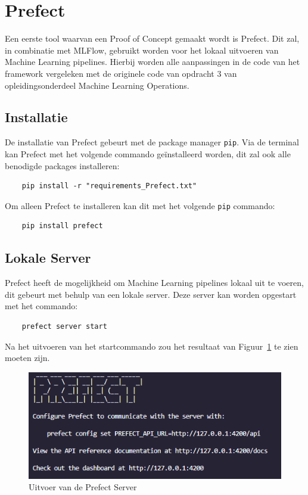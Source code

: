 
\section{Prefect}

Een eerste tool waarvan een Proof of Concept gemaakt wordt is Prefect. Dit zal, in combinatie met MLFlow, gebruikt worden voor het lokaal uitvoeren van Machine Learning pipelines. Hierbij worden alle aanpassingen in de code van het framework vergeleken met de originele code van opdracht 3 van opleidingsonderdeel Machine Learning Operations.

\subsection{Installatie}

De installatie van Prefect gebeurt met de package manager \texttt{pip}. Via de terminal kan Prefect met het volgende commando geïnstalleerd worden, dit zal ook alle benodigde packages installeren:


\begin{verbatim}
    pip install -r "requirements_Prefect.txt"
\end{verbatim}

Om alleen Prefect te installeren kan dit met het volgende \texttt{pip} commando:

\begin{verbatim}
    pip install prefect
\end{verbatim}

\subsection{Lokale Server}

Prefect heeft de mogelijkheid om Machine Learning pipelines lokaal uit te voeren, dit gebeurt met behulp van een lokale server. Deze server kan worden opgestart met het commando:

\begin{verbatim}
    prefect server start
\end{verbatim}

Na het uitvoeren van het startcommando zou het resultaat van Figuur~\ref{fig:Prefect_server} te zien moeten zijn.
\begin{figure}[h]
    \centering
    \includegraphics[width=0.9\linewidth]{graphics/Prefect_server.PNG}
    \caption{Uitvoer van de Prefect Server}
    \label{fig:Prefect_server}
\end{figure}

